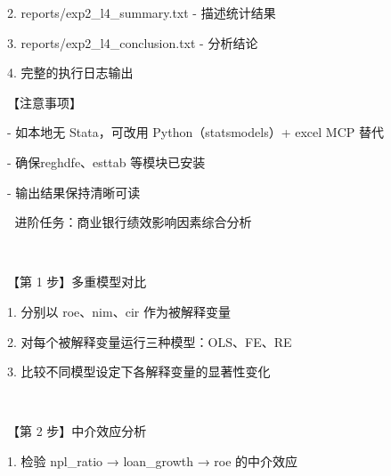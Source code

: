 \documentclass[
  american,
  chinese,
]{ctexart}
\begin{document}
\foreignlanguage{american}{2. reports/exp2\_l4\_summary.txt - }{描述统计结果}\foreignlanguage{american}{}

\foreignlanguage{american}{3. reports/exp2\_l4\_conclusion.txt - }{分析结论}\foreignlanguage{american}{}

\foreignlanguage{american}{4. }{完整的执行日志输出}\foreignlanguage{american}{}

{【注意事项】}\foreignlanguage{american}{}

\foreignlanguage{american}{- }{如本地无}\foreignlanguage{american}{ Stata}{，可改用}\foreignlanguage{american}{ Python}{（}{\foreignlanguage{american}{statsmodels}}{）}\foreignlanguage{american}{+ excel MCP }{替代}\foreignlanguage{american}{}

\foreignlanguage{american}{- }{确保}\foreignlanguage{american}{ {reghdfe}}{、}{\foreignlanguage{american}{esttab}}\foreignlanguage{american}{ }{等模块已安装}\foreignlanguage{american}{}

\foreignlanguage{american}{- }{输出结果保持清晰可读}\foreignlanguage{american}{}

\foreignlanguage{american}{}

\foreignlanguage{american}{🔬}\foreignlanguage{american}{ }{进阶任务：商业银行绩效影响因素综合分析}\foreignlanguage{american}{}

\foreignlanguage{american}{}

~

{【第}\foreignlanguage{american}{ 1 }{步】多重模型对比}\foreignlanguage{american}{}

\foreignlanguage{american}{1. }{分别以}\foreignlanguage{american}{ roe}{、}\foreignlanguage{american}{nim}{、}{\foreignlanguage{american}{cir}}\foreignlanguage{american}{ }{作为被解释变量}\foreignlanguage{american}{}

\foreignlanguage{american}{2. }{对每个被解释变量运行三种模型：}\foreignlanguage{american}{OLS}{、}\foreignlanguage{american}{FE}{、}\foreignlanguage{american}{RE}

\foreignlanguage{american}{3. }{比较不同模型设定下{各解释}变量的显著性变化}\foreignlanguage{american}{}

\foreignlanguage{american}{}

~

{【第}\foreignlanguage{american}{ 2 }{步】中介效应分析}\foreignlanguage{american}{}

\foreignlanguage{american}{1. }{检验}\foreignlanguage{american}{ {npl\_ratio} }{→}\foreignlanguage{american}{ {loan\_growth} }{→}\foreignlanguage{american}{ roe }{的中介效应}\foreignlanguage{american}{}
\end{document}
